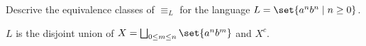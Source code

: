 \begin{exercise}
    Descrive the equivalence classes of $\equiv_L$ for the language
    $L = \set{a^nb^n \mid n \ge 0}$.
\end{exercise}
\begin{solution}
    $L$ is the disjoint union of
    $X = \bigsqcup_{0 \le m \le n} \set{a^nb^m}$ and $X^c$.
\end{solution}
